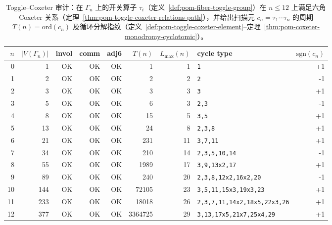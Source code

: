 \begin{table}[H]
\centering
\scriptsize
\setlength{\tabcolsep}{5pt}
\caption{Toggle--Coxeter 审计：在 $\Gamma_n$ 上的开关算子 $\tau_i$（定义~\ref{def:pom-fiber-toggle-group}）在 $n\le 12$ 上满足六角 Coxeter 关系（定理~\ref{thm:pom-toggle-coxeter-relations-path}），并给出扫描元 $c_n=\tau_1\cdots\tau_n$ 的周期 $T(n)=\mathrm{ord}(c_n)$ 及循环分解指纹（定义~\ref{def:pom-toggle-coxeter-element}--定理~\ref{thm:pom-coxeter-monodromy-cyclotomic}）。}
\label{tab:fibonacci_cube_toggle_coxeter_audit}
\begin{tabular}{r r r r r r r l r}
\toprule
$n$ & $|V(\Gamma_n)|$ & invol & comm & adj6 & $T(n)$ & $L_{\max}(n)$ & cycle type & $\mathrm{sgn}(c_n)$\\
\midrule
0 & 1 & OK & OK & OK & 1 & 1 & \texttt{1} & +1\\
1 & 2 & OK & OK & OK & 2 & 2 & \texttt{2} & -1\\
2 & 3 & OK & OK & OK & 3 & 3 & \texttt{3} & +1\\
3 & 5 & OK & OK & OK & 6 & 3 & \texttt{2,3} & -1\\
4 & 8 & OK & OK & OK & 15 & 5 & \texttt{3,5} & +1\\
5 & 13 & OK & OK & OK & 24 & 8 & \texttt{2,3,8} & +1\\
6 & 21 & OK & OK & OK & 231 & 11 & \texttt{3,7,11} & +1\\
7 & 34 & OK & OK & OK & 210 & 14 & \texttt{2,3,5,10,14} & -1\\
8 & 55 & OK & OK & OK & 1989 & 17 & \texttt{3,9,13x2,17} & +1\\
9 & 89 & OK & OK & OK & 240 & 20 & \texttt{2,3,8,12x2,16x2,20} & -1\\
10 & 144 & OK & OK & OK & 72105 & 23 & \texttt{3,5,11,15x3,19x3,23} & +1\\
11 & 233 & OK & OK & OK & 18018 & 26 & \texttt{2,3,7,11,14x2,18x5,22x3,26} & +1\\
12 & 377 & OK & OK & OK & 3364725 & 29 & \texttt{3,13,17x5,21x7,25x4,29} & +1\\
\bottomrule
\end{tabular}
\end{table}
